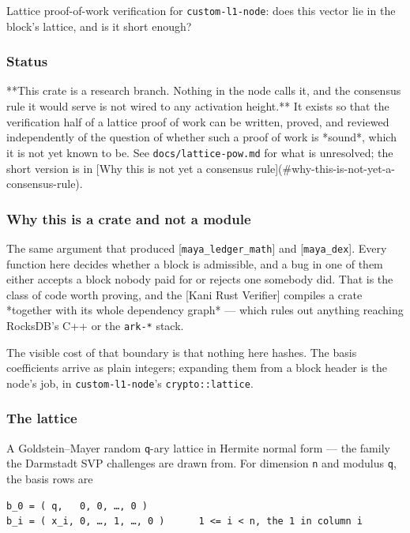 \documentclass[11pt,a4paper]{article}
\begin{document}
Lattice proof-of-work verification for \texttt{custom-l1-node}: does this vector
lie in the block's lattice, and is it short enough?

\subsubsection{Status}

**This crate is a research branch. Nothing in the node calls it, and the
consensus rule it would serve is not wired to any activation height.** It
exists so that the verification half of a lattice proof of work can be
written, proved, and reviewed independently of the question of whether such
a proof of work is *sound*, which it is not yet known to be. See
\texttt{docs/lattice-pow.md} for what is unresolved; the short version is in
[Why this is not yet a consensus rule](\#why-this-is-not-yet-a-consensus-rule).

\subsubsection{Why this is a crate and not a module}

The same argument that produced [\texttt{maya\_ledger\_math}] and [\texttt{maya\_dex}]. Every
function here decides whether a block is admissible, and a bug in one of
them either accepts a block nobody paid for or rejects one somebody did.
That is the class of code worth proving, and the [Kani Rust Verifier]
compiles a crate *together with its whole dependency graph* — which rules
out anything reaching RocksDB's C++ or the \texttt{ark-*} stack.

The visible cost of that boundary is that nothing here hashes. The basis
coefficients arrive as plain integers; expanding them from a block header is
the node's job, in \texttt{custom-l1-node}'s \texttt{crypto::lattice}.

\subsubsection{The lattice}

A Goldstein–Mayer random \texttt{q}-ary lattice in Hermite normal form — the family
the Darmstadt SVP challenges are drawn from. For dimension \texttt{n} and modulus
\texttt{q}, the basis rows are

\begin{verbatim}
b_0 = ( q,   0, 0, …, 0 )
b_i = ( x_i, 0, …, 1, …, 0 )      1 <= i < n, the 1 in column i
\end{verbatim}
\end{document}
